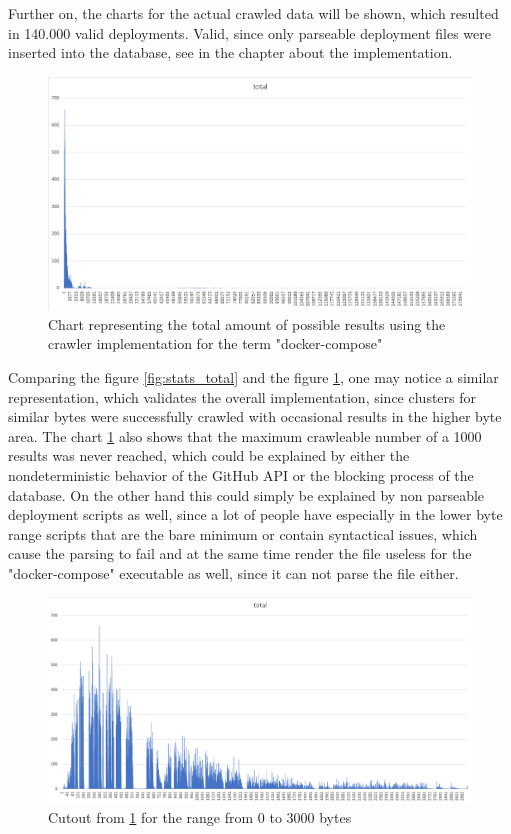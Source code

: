 Further on, the charts for the actual crawled data will be shown, which resulted in 140.000 valid deployments. Valid, since only parseable deployment files were inserted into the database, see  in the chapter about the implementation.

\begin{figure}[H]
    \centering
    \includegraphics[scale=0.5]{graphics/deployment_stats_total.png}
    \caption{Chart representing the total amount of possible results using the crawler implementation for the term "docker-compose"}
    \label{fig:deployment_total}
\end{figure}

Comparing the figure \ref{fig:stats_total} and the figure \ref{fig:deployment_total}, one may notice a similar representation, which validates the overall implementation, since clusters for similar bytes were successfully crawled with occasional results in the higher byte area.
The chart \ref{fig:deployment_total} also shows that the maximum crawleable number of a 1000 results was never reached, which could be explained by either the nondeterministic behavior of the GitHub API or the blocking process of the database. On the other hand this could simply be explained by non parseable deployment scripts as well, since a lot of people have especially in the lower byte range scripts that are the bare minimum or contain syntactical issues, which cause the parsing to fail and at the same time render the file useless for the "docker-compose" executable as well, since it can not parse the file either.

\begin{figure}[H]
    \centering
    \includegraphics[scale=0.5]{graphics/deployment_stats_range.png}
    \caption{Cutout from \ref{fig:deployment_total} for the range from 0 to 3000 bytes}
    \label{fig:deployment_range}
\end{figure}

